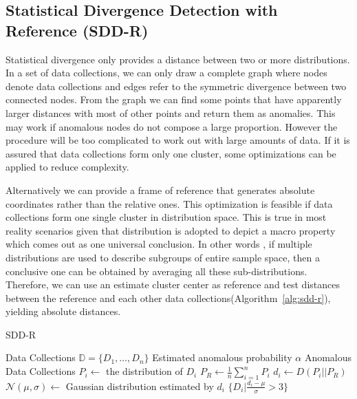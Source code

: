 \documentclass{article}
\begin{document}
		\subsection{Statistical Divergence Detection with Reference (SDD-R)}\label{sec:alg-opt-reference}
			Statistical divergence only provides a distance between two or more distributions. In a set of data collections, we can only draw a complete graph where nodes denote data collections and edges refer to the symmetric divergence between two connected nodes. From the graph we can find some points that have apparently larger distances with most of other points and return them as anomalies. This may work if anomalous nodes do not compose a large proportion. However the procedure will be too complicated to work out with large amounts of data. If it is assured that data collections form only one cluster, some optimizations can be applied to reduce complexity.
			
			Alternatively we can provide a frame of reference that generates absolute coordinates rather than the relative ones. This optimization is feasible if data collections form one single cluster in distribution space. This is true in most reality scenarios given that distribution is adopted to depict a macro property which comes out as one universal conclusion. In other words , if multiple distributions are used to describe subgroups of entire sample space, then a conclusive one can be obtained by averaging all these sub-distributions. Therefore, we can use an estimate cluster center as reference and test distances between the reference and each other data collections(Algorithm~\ref{alg:sdd-r}), yielding absolute distances.
	
			\begin{algorithm}[!t]
				\caption{SDD-R}
				\label{alg:sdd-r}
				\begin{algorithmic}[1]
					\Require Data Collections $\mathbb{D} = \{D_1, \dots, D_n\}$
					\Require Estimated anomalous probability $\alpha$
					\Ensure Anomalous Data Collections
					\State $P_i \gets$ the distribution of $D_i$
					\EndFor
					\State $P_R \gets \frac{1}{n}\sum_{i = 1}^n P_i$
					\State $d_i \gets D(P_i||P_R)$
					\EndFor
					\State $\mathcal{N}(\mu, \sigma) \gets$ Gaussian distribution estimated by $d_i$
					\State \Return $\{D_i | \frac{d_i - \mu}{\sigma} > 3 \}$
				\end{algorithmic}
			\end{algorithm}
	
\end{document}
